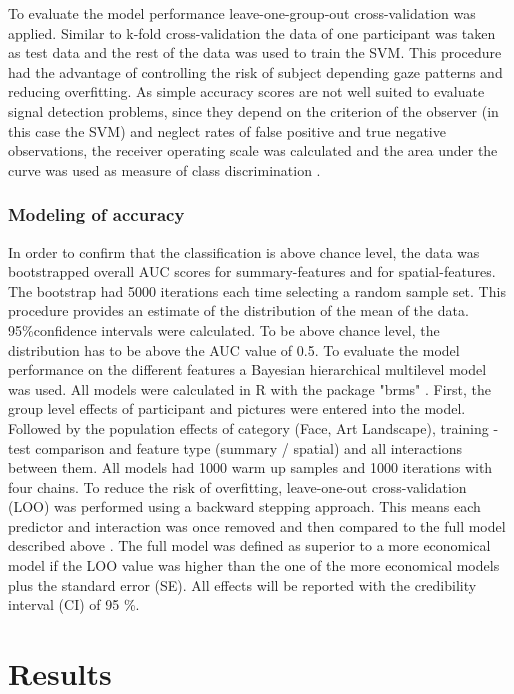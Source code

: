 \documentclass[a4paper,man,natbib,floatsintext]{apa6}
\begin{document}
To evaluate the model performance leave-one-group-out cross-validation was applied. Similar to k-fold cross-validation the data of one participant was taken as test data and the rest of the data was used to train the SVM. This procedure had the advantage of controlling the risk of subject depending gaze patterns and reducing overfitting. As simple accuracy scores are not well suited to evaluate signal detection problems, since they depend on the criterion of the observer (in this case the SVM)  and neglect rates of false positive and true negative observations, the receiver operating scale was calculated and the area under the curve was used as measure of class discrimination \citep{Hsu2010}.\\ 

\subsubsection{Modeling of accuracy}
In order to confirm that the classification is above chance level, the data was bootstrapped overall AUC scores for summary-features and for spatial-features. The bootstrap had 5000 iterations each time selecting a random sample set. This procedure provides an estimate of the distribution of the mean of the data. 95\%confidence intervals were calculated. To be above chance level, the distribution has to be above the AUC value of 0.5.
To evaluate the model performance on the different features a Bayesian hierarchical multilevel model was used.  All models were calculated in R \citep{RDevelopmentCoreTeam2016} with the package "brms" \citep{buerkner2016brms}. First, the group level effects of participant and pictures were entered into the model. Followed by the population effects of category (Face, Art Landscape), training - test comparison and feature type (summary / spatial) and all interactions between them. All models had 1000 warm up samples and 1000 iterations with four chains. 
To reduce the risk of overfitting, leave-one-out cross-validation (LOO) was performed using a backward stepping approach. This means each predictor and interaction was once removed and then compared to the full model described above \citep{Vehtari2016}. The full model was defined as superior to a more economical model if the LOO value was higher than the one of the more economical models plus the standard error (SE). All effects will be reported with the credibility interval (CI) of 95 \%. 


\section{Results}
\end{document}

